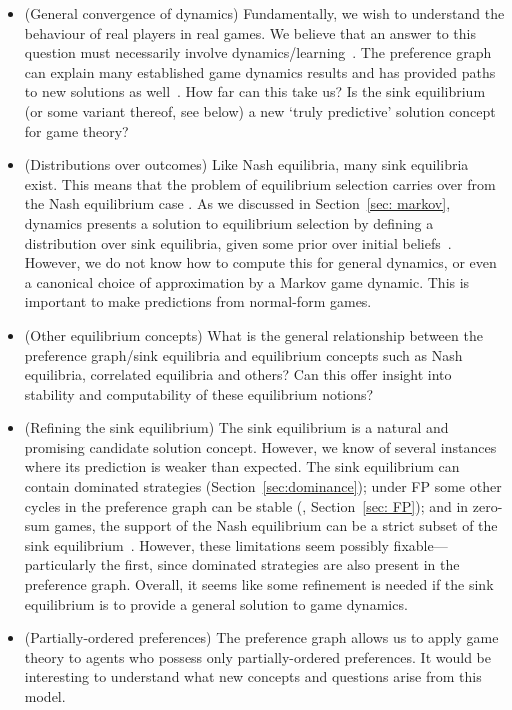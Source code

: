 \documentclass[preprint,authoryear]{elsarticle}
\begin{document}
\begin{itemize}
    \item (General convergence of dynamics) Fundamentally, we wish to understand the behaviour of real players in real games. We believe that an answer to this question must necessarily involve dynamics/learning~\citep{papadimitriou_game_2019}. The preference graph can explain many established game dynamics results \citep{shapley_topics_1964,jordan_three_1993,berger_two_2007} and has provided paths to new solutions as well~\citep{biggar_replicator_2023,biggar_attractor_2024}. How far can this take us? Is the sink equilibrium (or some variant thereof, see below) a new `truly predictive' solution concept for game theory?
    \item (Distributions over outcomes) Like Nash equilibria, many sink equilibria exist. This means that the problem of equilibrium selection carries over from the Nash equilibrium case \citep{harsanyi1988general}. As we discussed in Section~\ref{sec: markov}, dynamics presents a solution to equilibrium selection by defining a distribution over sink equilibria, given some prior over initial beliefs~\citep{papadimitriou_game_2019}. However, we do not know how to compute this for general dynamics, or even a canonical choice of approximation by a Markov game dynamic. This is important to make predictions from normal-form games.
    \item (Other equilibrium concepts) What is the general relationship between the preference graph/sink equilibria and equilibrium concepts such as Nash equilibria, correlated equilibria and others? Can this offer insight into stability and computability of these equilibrium notions?
    \item (Refining the sink equilibrium) The sink equilibrium is a natural and promising candidate solution concept. However, we know of several instances where its prediction is weaker than expected. The sink equilibrium can contain dominated strategies (Section~\ref{sec:dominance}); under FP some other cycles in the preference graph can be stable (\cite{foster_nonconvergence_1998}, Section~\ref{sec: FP}); and in zero-sum games, the support of the Nash equilibrium can be a strict subset of the sink equilibrium~\citep{biggar_attractor_2024}. However, these limitations seem possibly fixable---particularly the first, since dominated strategies are also present in the preference graph. Overall, it seems like some refinement is needed if the sink equilibrium is to provide a general solution to game dynamics.
    \item (Partially-ordered preferences) The preference graph allows us to apply game theory to agents who possess only partially-ordered preferences. It would be interesting to understand what new concepts and questions arise from this model.
\end{itemize}



\end{document}
